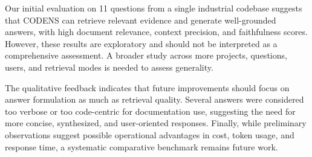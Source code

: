 \documentclass[sigconf]{acmart}
\begin{document}
Our initial evaluation on 11 questions from a single industrial codebase suggests that CODENS can retrieve relevant evidence and generate well-grounded answers, with high document relevance, context precision, and faithfulness scores. 
However, these results are exploratory and should not be interpreted as a comprehensive assessment. 
A broader study across more projects, questions, users, and retrieval modes is needed to assess generality.

The qualitative feedback indicates that future improvements should focus on answer formulation as much as retrieval quality. 
Several answers were considered too verbose or too code-centric for documentation use, suggesting the need for more concise, synthesized, and user-oriented responses. 
Finally, while preliminary observations suggest possible operational advantages in cost, token usage, and response time, a systematic comparative benchmark remains future work.





\end{document}
